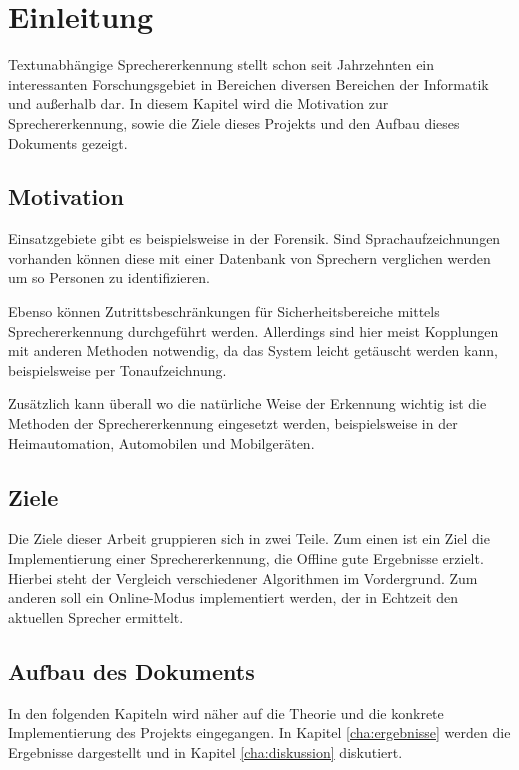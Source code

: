 \chapter{Einleitung}
Textunabhängige Sprechererkennung stellt schon seit Jahrzehnten ein interessanten Forschungsgebiet in Bereichen diversen Bereichen der Informatik und außerhalb dar. \cite{bib:speakerRecognition} In diesem Kapitel wird die Motivation zur Sprechererkennung, sowie die Ziele dieses Projekts und den Aufbau dieses Dokuments gezeigt.

\section{Motivation}
Einsatzgebiete gibt es beispielsweise in der Forensik. Sind Sprachaufzeichnungen vorhanden können diese mit einer Datenbank von Sprechern verglichen werden um so Personen zu identifizieren.

Ebenso können Zutrittsbeschränkungen für Sicherheitsbereiche mittels Sprechererkennung durchgeführt werden. Allerdings sind hier meist Kopplungen mit anderen Methoden notwendig, da das System leicht getäuscht werden kann, beispielsweise per Tonaufzeichnung.

Zusätzlich kann überall wo die natürliche Weise der Erkennung wichtig ist die Methoden der Sprechererkennung eingesetzt werden, beispielsweise in der Heimautomation, Automobilen und Mobilgeräten.

\section{Ziele}
Die Ziele dieser Arbeit gruppieren sich in zwei Teile. Zum einen ist ein Ziel die Implementierung einer Sprechererkennung, die Offline gute Ergebnisse erzielt. Hierbei steht der Vergleich verschiedener Algorithmen im Vordergrund. Zum anderen soll ein Online-Modus implementiert werden, der in Echtzeit den aktuellen Sprecher ermittelt.

\section{Aufbau des Dokuments}
In den folgenden Kapiteln wird näher auf die Theorie und die konkrete Implementierung des Projekts eingegangen. In Kapitel \ref{cha:ergebnisse} werden die Ergebnisse dargestellt und in Kapitel \ref{cha:diskussion} diskutiert.
